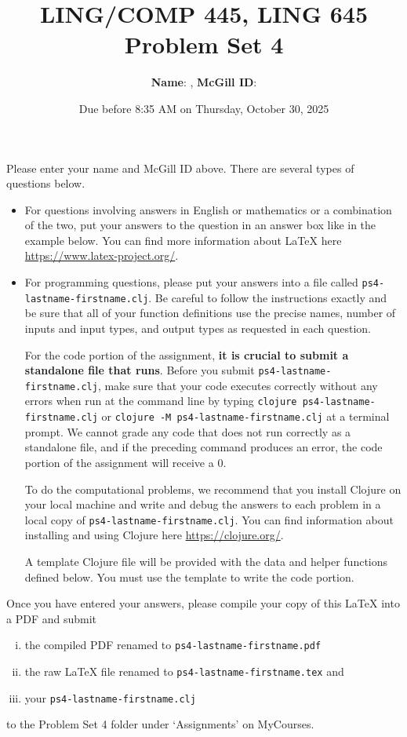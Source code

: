\documentclass[10pt]{article}
\author{ 
  \textbf{Name}:       %
, \textbf{McGill ID}:  %
}
\newcommand{\PSnum}{4}
\begin{document}
\title{LING/COMP 445, LING 645\\Problem Set \PSnum}
\date{Due before 8:35 AM on Thursday, October 30, 2025}
\maketitle
Please enter your name and McGill ID above.
There are several types of questions below. 
\begin{itemize}
\item
For questions involving answers in English or mathematics or a
combination of the two, put your answers to the question in an
answer box like in the example below. You can find more
information about \LaTeX{} here \url{https://www.latex-project.org/}.

\item For programming questions,
please put your answers into a file called
\texttt{ps\PSnum-lastname-firstname.clj}. Be careful to follow the instructions
exactly and be sure that all of your function definitions use the
precise names, number of inputs and input types, and output types as
requested in each question.

For the code portion of the assignment, \textbf{it is crucial to submit a
standalone file that runs}. Before you submit \texttt{ps\PSnum-lastname-firstname.clj}, 
make sure that your code executes correctly without any errors 
when run at the command line by typing 
\texttt{clojure ps\PSnum-lastname-firstname.clj} or \texttt{clojure -M ps\PSnum-lastname-firstname.clj}  at a terminal
prompt. We cannot grade any code that does not run correctly as a
standalone file, and if the preceding command produces an error,
the code portion of the assignment will receive a $0$.

To do the computational problems, we recommend that you install
Clojure on your local machine and write and debug the answers to each
problem in a local copy of \texttt{ps\PSnum-lastname-firstname.clj}. You can
find information about installing and using Clojure here
\url{https://clojure.org/}.

A template Clojure file will be provided with the data and helper functions defined below. You must use the template to write the code portion.
\end{itemize}
Once you have entered your answers, please compile your copy of this
\LaTeX{} into a PDF and submit 
\begin{enumerate}[(i),noitemsep]
\item
the compiled PDF renamed to
\texttt{ps\PSnum-lastname-firstname.pdf} 
\item
the raw \LaTeX{} file renamed to
\texttt{ps\PSnum-lastname-firstname.tex} and 
\item
your \texttt{ps\PSnum-lastname-firstname.clj}
\end{enumerate}
to the Problem Set \PSnum{} folder under `Assignments' on MyCourses.
\end{document}
